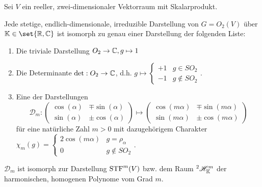 \begin{theorem}
Sei $V$ ein reeller, zwei-dimensionaler Vektorraum mit Skalarprodukt.

Jede stetige, endlich-dimensionale, irreduzible Darstellung von $G=O_2(V)$ über $\IK\in\set{\IR,\IC}$ ist isomorph zu genau einer Darstellung der folgenden Liste:
\begin{enumerate}
\item Die triviale Darstellung $O_2\to\mathbb{C}, g\mapsto 1$
\item Die Determinante $\det: O_2\to\mathbb{C}$, d.h. $g\mapsto\begin{cases}+1&g\in SO_2 \\ -1&g\notin SO_2\end{cases}$.
\item Eine der Darstellungen
\[\mathcal{D}_m : \begin{pmatrix}\cos(\alpha)&\mp\sin(\alpha)\\\sin(\alpha)&\pm\cos(\alpha)\end{pmatrix} \mapsto \begin{pmatrix}\cos(m\alpha)&\mp\sin(m\alpha)\\\sin(m\alpha)&\pm\cos(m\alpha)\end{pmatrix}\]
für eine natürliche Zahl $m>0$ mit dazugehörigem Charakter $\chi_m(g) = \begin{cases} 2\cos(m\alpha) & g=\rho_\alpha \\ 0 & g\notin SO_2\end{cases}$.
\end{enumerate}
$\mathcal{D}_m$ ist isomorph zur Darstellung $\operatorname{STF}^m(V)$ bzw. dem Raum ${^2} \mathscr{H}_{\mathbb{K}}^m$ der harmonischen, homogenen Polynome vom Grad $m$.
\end{theorem}
